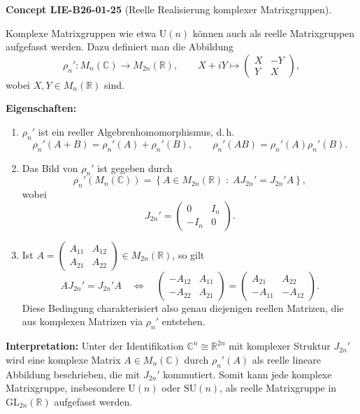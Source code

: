 \documentclass[10pt, letterpaper]{article}
\newcommand{\CustomHeading}[3]{%
  \par\medskip\noindent%
  \textbf{#1 #2} \textnormal{(#3)}.\enskip%
}
\newenvironment{CONC}[2]{\begin{unitbox}\CustomHeading{Concept}{#1}{#2}}{\end{unitbox}}
\begin{document}
\begin{CONC}{LIE-B26-01-25}{Reelle Realisierung komplexer Matrixgruppen}
Komplexe Matrixgruppen wie etwa $\mathrm{U}(n)$ können auch als reelle Matrixgruppen aufgefasst werden.  
Dazu definiert man die Abbildung
\[
\rho_n' : M_n(\mathbb{C}) \longrightarrow M_{2n}(\mathbb{R}), \qquad
X + iY \longmapsto
\begin{pmatrix}
X & -Y \\[3pt]
Y & X
\end{pmatrix},
\]
wobei $X, Y \in M_n(\mathbb{R})$ sind.

\textbf{Eigenschaften:}
\begin{enumerate}
\item $\rho_n'$ ist ein reeller Algebrenhomomorphismus, d.\,h.
\[
\rho_n'(A + B) = \rho_n'(A) + \rho_n'(B), \qquad
\rho_n'(A B) = \rho_n'(A)\rho_n'(B).
\]
\item Das Bild von $\rho_n'$ ist gegeben durch
\[
\rho_n'(M_n(\mathbb{C})) =
\left\{
A \in M_{2n}(\mathbb{R}) \; : \; A J_{2n}' = J_{2n}' A
\right\},
\]
wobei
\[
J_{2n}' =
\begin{pmatrix}
0 & I_n \\[3pt]
- I_n & 0
\end{pmatrix}.
\]
\item Ist $A = 
\begin{pmatrix}
A_{11} & A_{12} \\[3pt]
A_{21} & A_{22}
\end{pmatrix}
\in M_{2n}(\mathbb{R})$, so gilt
\[
A J_{2n}' = J_{2n}' A
\quad \Longleftrightarrow \quad
\begin{pmatrix}
- A_{12} & A_{11} \\[3pt]
- A_{22} & A_{21}
\end{pmatrix}
=
\begin{pmatrix}
A_{21} & A_{22} \\[3pt]
- A_{11} & - A_{12}
\end{pmatrix}.
\]
Diese Bedingung charakterisiert also genau diejenigen reellen Matrizen, die aus komplexen Matrizen via $\rho_n'$ entstehen.
\end{enumerate}

\textbf{Interpretation:}  
Unter der Identifikation $\mathbb{C}^n \cong \mathbb{R}^{2n}$ mit komplexer Struktur $J_{2n}'$ wird eine komplexe Matrix $A \in M_n(\mathbb{C})$ durch $\rho_n'(A)$ als reelle lineare Abbildung beschrieben, die mit $J_{2n}'$ kommutiert.  
Somit kann jede komplexe Matrixgruppe, insbesondere $\mathrm{U}(n)$ oder $\mathrm{SU}(n)$, als reelle Matrixgruppe in $\mathrm{GL}_{2n}(\mathbb{R})$ aufgefasst werden.
\end{CONC}
\end{document}
